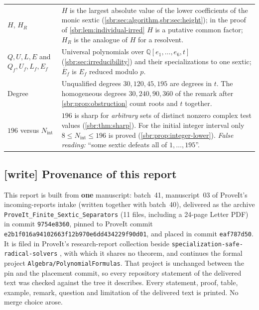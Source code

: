 \documentclass[11pt,letterpaper]{article}
\numberwithin{equation}{section}
\theoremstyle{definition}
\theoremstyle{remark}
\newcommand{\QQ}{\mathbb Q}
\newcommand{\src}[1]{\texttt{\nolinkurl{#1}}}
\newcommand{\snapshot}{\texttt{e2b1f016a94102663f12b970e6dd434229f90d01}}
\begin{document}
\begin{center}
\begin{longtable}{@{}>{\raggedright\arraybackslash}p{}
 >{\raggedright\arraybackslash}p{}@{}}
$H$, $H_R$ & $H$ is the largest absolute value of the lower coefficients
of the monic sextic (\cref{sbr:sec:algorithm,sbr:sec:height}); in the proof
of \cref{sbr:lem:individual-irred} $H$ is a putative common factor; $H_R$ is
the analogue of $H$ for a resolvent.\\[3pt]
$Q,U,L,E$ and $Q_f,U_f,L_f,E_f$ & Universal polynomials over
$\QQ[e_1,\ldots,e_6,t]$ (\cref{sbr:sec:irreducibility}) and their
specializations to one sextic; $\overline E_f$ is $E_f$ reduced modulo
$p$.\\[3pt]
Degree & Unqualified degrees $30,120,45,195$ are degrees in $t$. The
homogeneous degrees $30,240,90,360$ of the remark after
\cref{sbr:prop:obstruction} count roots and $t$ together.\\[3pt]
$196$ versus $N_{\mathrm{int}}$ & $196$ is sharp for \emph{arbitrary}
sets of distinct nonzero complex test values (\cref{sbr:thm:sharp}). For
the initial integer interval only $8\le N_{\mathrm{int}}\le196$ is proved
(\cref{sbr:prop:integer-lower}). \emph{False reading:} ``some sextic
defeats all of $1,\ldots,195$''.\\
\end{longtable}
\end{center}

\subsection{[write] Provenance of this report}
\label{sbr:sec:provenance}

This report is built from \textbf{one} manuscript: batch~41, manuscript~03
of ProveIt's incoming-reports intake (written together with batch~40),
delivered as the archive \src{ProveIt_Finite_Sextic_Separators} (11 files,
including a 24-page Letter PDF) in commit \src{9754e8360}, pinned to ProveIt
commit \snapshot, and placed in commit \src{eaf787d50}. It is filed in
ProveIt's research-report collection beside
\src{specialization-safe-radical-solvers} \cite{rss}, with which it shares
no theorem, and continues the formal project
\src{Algebra/PolynomialFormulas}. That project is unchanged between the pin
and the placement commit, so every repository statement of the delivered
text was checked against the tree it describes. Every statement, proof,
table, example, remark, question and limitation of the delivered text is
printed. No merge choice arose.
\end{document}
